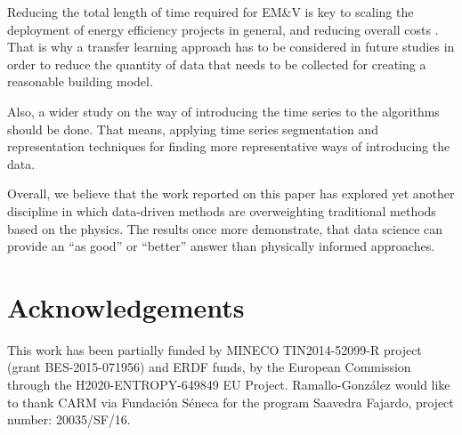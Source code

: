 \documentclass[10pt, conference, compsocconf]{IEEEtran}
\begin{document}
Reducing the total length of time required for EM\&V is key to scaling the deployment of energy efficiency projects in general, and reducing overall costs \cite{granderson2015automated}. That is why a transfer learning approach has to be considered in future studies in order to reduce the quantity of data that needs to be collected for creating a reasonable building model.

Also, a wider study on the way of introducing the time series to the algorithms should be done. That means, applying time series segmentation and representation techniques for finding more representative ways of introducing the data. 


Overall, we believe that the work reported on this paper has explored yet another discipline in which data-driven methods are overweighting traditional methods based on the physics. The results once more demonstrate, that data science can provide an “as good” or “better” answer than physically informed approaches.

\section*{Acknowledgements}

This work has been partially funded by MINECO TIN2014-52099-R project (grant BES-2015-071956) and ERDF funds, by the European Commission through the H2020-ENTROPY-649849 EU Project. Ramallo-González would like to thank CARM via Fundación Séneca for the program Saavedra Fajardo, project number: 20035/SF/16.


%
%
\end{document}
